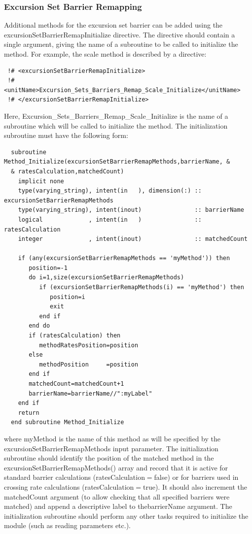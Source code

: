 \subsubsection{Excursion Set Barrier Remapping}\label{sec:excursionSetBarrierRemapInitialize}

Additional methods for the excursion set barrier can be added using the {\normalfont \ttfamily excursionSetBarrierRemapInitialize} directive. The directive should contain a single argument, giving the name of a subroutine to be called to initialize the method. For example, the {\normalfont \ttfamily scale} method is described by a directive:
\begin{verbatim}
 !# <excursionSetBarrierRemapInitialize>
 !#  <unitName>Excursion_Sets_Barriers_Remap_Scale_Initialize</unitName>
 !# </excursionSetBarrierRemapInitialize>
\end{verbatim}
Here, {\normalfont \ttfamily Excursion\_Sets\_Barriers\_Remap\_Scale\_Initialize} is the name of a subroutine which will be called to initialize the method. The initialization subroutine must have the following form:
\begin{verbatim}
  subroutine Method_Initialize(excursionSetBarrierRemapMethods,barrierName, &
  & ratesCalculation,matchedCount)
    implicit none
    type(varying_string), intent(in   ), dimension(:) :: excursionSetBarrierRemapMethods
    type(varying_string), intent(inout)               :: barrierName
    logical             , intent(in   )               :: ratesCalculation
    integer             , intent(inout)               :: matchedCount

    if (any(excursionSetBarrierRemapMethods == 'myMethod')) then
       position=-1
       do i=1,size(excursionSetBarrierRemapMethods)
          if (excursionSetBarrierRemapMethods(i) == 'myMethod') then
             position=i
             exit
          end if
       end do
       if (ratesCalculation) then
          methodRatesPosition=position
       else
          methodPosition     =position
       end if
       matchedCount=matchedCount+1
       barrierName=barrierName//":myLabel"
    end if
    return
  end subroutine Method_Initialize
\end{verbatim}
where {\normalfont \ttfamily myMethod} is the name of this method as will be specified by the {\normalfont \ttfamily excursionSetBarrierRemapMethods} input parameter. The initialization subroutine should identify the position of the matched method in the {\normalfont \ttfamily excursionSetBarrierRemapMethods()} array and record that it is active for standard barrier calculations ({\normalfont \ttfamily ratesCalculation}$=${\normalfont \ttfamily false}) or for barriers used in crossing rate calculations ({\normalfont \ttfamily ratesCalculation}$=${\normalfont \ttfamily true}). It should also increment the {\normalfont \ttfamily matchedCount} argument (to allow checking that all specified barriers were matched) and append a descriptive label to the{\normalfont \ttfamily barrierName} argument. The initialization subroutine should perform any other tasks required to initialize the module (such as reading parameters etc.).

